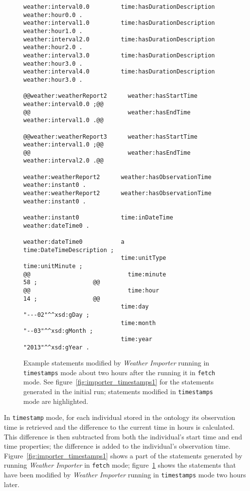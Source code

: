 \begin{figure}
\begin{lstlisting}[escapechar=!]
weather:interval0.0         time:hasDurationDescription           weather:hour0.0 .
weather:interval1.0         time:hasDurationDescription           weather:hour1.0 .
weather:interval2.0         time:hasDurationDescription           weather:hour2.0 .
weather:interval3.0         time:hasDurationDescription           weather:hour3.0 .
weather:interval4.0         time:hasDurationDescription           weather:hour3.0 .

@@weather:weatherReport2      weather:hasStartTime                  weather:interval0.0 ;@@
@@                            weather:hasEndTime                    weather:interval1.0 .@@

@@weather:weatherReport3      weather:hasStartTime                  weather:interval1.0 ;@@
@@                            weather:hasEndTime                    weather:interval2.0 .@@

weather:weatherReport2      weather:hasObservationTime            weather:instant0 .
weather:weatherReport2      weather:hasObservationTime            weather:instant0 .

weather:instant0            time:inDateTime                       weather:dateTime0 .

weather:dateTime0           a                                     time:DateTimeDescription ;
                            time:unitType                         time:unitMinute ;
@@                            time:minute                           58 ;                @@
@@                            time:hour                             14 ;                @@
                            time:day                              "---02"^^xsd:gDay ;
                            time:month                            "--03"^^xsd:gMonth ;
                            time:year                             "2013"^^xsd:gYear .
\end{lstlisting}
\caption{Example statements modified by \emph{Weather Importer} running in \texttt{timestamps} mode about two hours after the running it in \texttt{fetch} mode. See figure~\ref{fig:importer_timestamps1} for the statements generated in the initial run; statements modified in \texttt{timestamps} mode are highlighted.}
\label{fig:importer_timestamps2}
\end{figure}

In \texttt{timestamp} mode, for each  individual stored in the ontology its observation time is retrieved and the difference to the current time in hours is calculated. This difference is then subtracted from both the individual's start time and end time properties; the difference is added to the individual's observation time. Figure~\ref{fig:importer_timestamps1} shows a part of the statements generated by running \emph{Weather Importer} in \texttt{fetch} mode; figure~\ref{fig:importer_timestamps2} shows the statements that have been modified by \emph{Weather Importer} running in \texttt{timestamps} mode two hours later.

